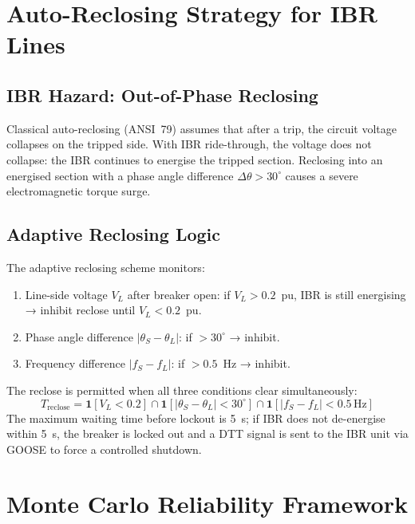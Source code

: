 \section{Auto-Reclosing Strategy for IBR Lines}
\label{sec:ch7_autoreclosing}

\subsection{IBR Hazard: Out-of-Phase Reclosing}

Classical auto-reclosing (ANSI~79) assumes that after a trip, the circuit
voltage collapses on the tripped side. With IBR ride-through, the voltage
does not collapse: the IBR continues to energise the tripped section.
Reclosing into an energised section with a phase angle difference
$\Delta\theta > 30^\circ{}$ causes a severe electromagnetic torque surge.

\subsection{Adaptive Reclosing Logic}

The adaptive reclosing scheme monitors:
\begin{enumerate}
\item Line-side voltage $V_L$ after breaker open: if $V_L > 0.2$~pu, IBR
      is still energising → inhibit reclose until $V_L < 0.2$~pu.
\item Phase angle difference $|\theta_S - \theta_L|$: if $> 30^\circ{}$ → inhibit.
\item Frequency difference $|f_S - f_L|$: if $> 0.5$~Hz → inhibit.
\end{enumerate}
The reclose is permitted when all three conditions clear simultaneously:
\begin{equation}
  T_\mathrm{reclose} = \mathbf{1}\!\left[V_L < 0.2\right]
    \cap \mathbf{1}\!\left[|\theta_S - \theta_L| < 30^\circ{}\right]
    \cap \mathbf{1}\!\left[|f_S - f_L| < 0.5\,\mathrm{Hz}\right]
  \label{eq:ch5_reclose}
\end{equation}
The maximum waiting time before lockout is 5~s; if IBR does not
de-energise within 5~s, the breaker is locked out and a DTT signal is
sent to the IBR unit via GOOSE to force a controlled shutdown.

\section{Monte Carlo Reliability Framework}
\label{sec:ch7_reliability}


